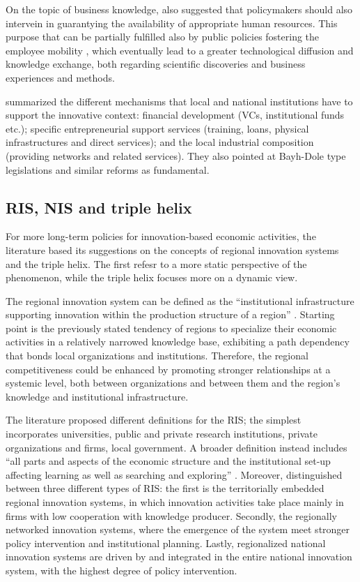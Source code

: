 On the topic of business knowledge, \citet{Chapple2005} also suggested that policymakers should also intervein in guarantying the availability of appropriate human resources. This purpose that can be partially fulfilled also by public policies fostering the employee mobility \citep{Franco2000}, which eventually lead to a greater technological diffusion and knowledge exchange, both regarding scientific discoveries and business experiences and methods. 

\citet{Fini2009} summarized the different mechanisms that local and national institutions have to support the innovative context: financial development (VCs, institutional funds etc.); specific entrepreneurial support services (training, loans, physical infrastructures and direct services); and the local industrial composition (providing networks and related services). They also pointed at Bayh-Dole type legislations and similar reforms as fundamental. 

\subsection{RIS, NIS and triple helix}

For more long-term policies for innovation-based economic activities, the literature based its suggestions on the concepts of regional innovation systems and the triple helix. The first refesr to a more static perspective of the phenomenon, while the triple helix focuses more on a dynamic view.

The regional innovation system can be defined as the \enquote{institutional infrastructure supporting innovation within the production structure of a region} \citep{Asheim2009}. Starting point is the previously stated tendency of regions to specialize their economic activities in a relatively narrowed knowledge base, exhibiting a path dependency that bonds local organizations and institutions. Therefore, the regional competitiveness could be enhanced by promoting stronger relationships at a systemic level, both between organizations and between them and the region's knowledge and institutional infrastructure.

The literature proposed different definitions for the RIS; the simplest incorporates universities, public and private research institutions, private organizations and firms, local government. A broader definition instead includes \enquote{all parts and aspects of the economic structure and the institutional set-up affecting learning as well as searching and exploring} \citep{Etzkowitz2000}. Moreover, \citet{Asheim2009} distinguished between three different types of RIS: the first is the territorially embedded regional innovation systems, in which innovation activities take place mainly in firms with low cooperation with knowledge producer. Secondly, the regionally networked innovation systems, where the emergence of the system meet stronger policy intervention and institutional planning. Lastly, regionalized national innovation systems are driven by and integrated in the entire national innovation system, with the highest degree of policy intervention.

